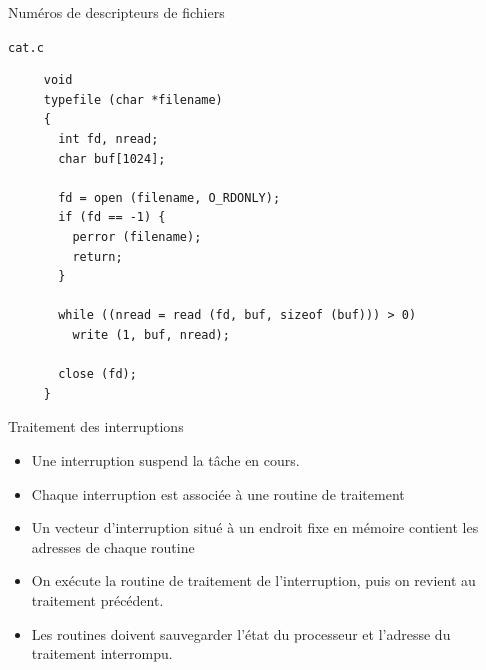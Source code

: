 \documentclass[11pt]{beamer}
\begin{document}
\begin{slide}{Numéros de descripteurs de fichiers}
\end{slide}

\begin{slide}{\texttt{cat.c}}
  \small
  \begin{verbatim}
     void
     typefile (char *filename)
     {
       int fd, nread;
       char buf[1024];

       fd = open (filename, O_RDONLY);
       if (fd == -1) {
         perror (filename);
         return;
       }

       while ((nread = read (fd, buf, sizeof (buf))) > 0)
         write (1, buf, nread);

       close (fd);
     }
\end{verbatim}
\end{slide}

\begin{frame}{Traitement des interruptions}

\begin{itemize}
\itemsep1pt\parskip0pt
\item
  Une interruption suspend la tâche en cours.
\item
  Chaque interruption est associée à une routine de traitement
\item
  Un vecteur d'interruption situé à un endroit fixe en mémoire contient
  les adresses de chaque routine
\item
  On exécute la routine de traitement de l'interruption, puis on revient
  au traitement précédent.
\item
  Les routines doivent sauvegarder l'état du processeur et l'adresse du
  traitement interrompu.
\end{itemize}

\end{frame}
\end{document}
